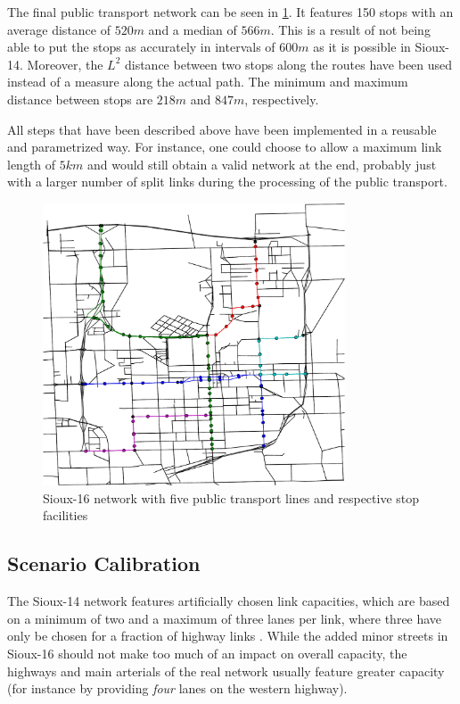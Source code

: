 The final public transport network can be seen in \cref{fig:pt_network}. It features
150 stops with an average distance of $520m$ and a median of $566m$. This is a
result of not being able to put the stops as accurately in intervals of $600m$
as it is possible in Sioux-14. Moreover, the $L^2$ distance between two stops along
the routes have been used instead of a measure along the actual path. The minimum
and maximum distance between stops are $218m$ and $847m$, respectively.

All steps that have been described above have been implemented in a reusable and
parametrized way. For instance, one could choose to allow a maximum link length of
$5km$ and would still obtain a valid network at the end, probably just with a larger
number of split links during the processing of the public transport.

\begin{figure}[h]
    \centering
    \includegraphics[width=0.8\textwidth]{figures/pt_network_cropped.pdf}
    \caption{Sioux-16 network with five public transport lines and respective stop
    facilities}
    \label{fig:pt_network}
\end{figure}

\subsection{Scenario Calibration}

The Sioux-14 network features artificially chosen link capacities, which are based
on a minimum of two and a maximum of three lanes per link, where three have only
be chosen for a fraction of highway links \citep{Chakirov2014}. While the added
minor streets in Sioux-16 should not make too much of an impact on overall
capacity, the highways and main arterials of the real network usually feature
greater capacity (for instance by providing \textit{four} lanes on the western highway).

